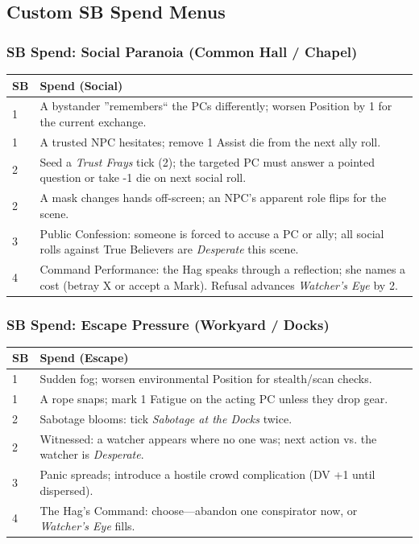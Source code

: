 \documentclass[11pt]{article}
\begin{document}
\subsection{Custom SB Spend Menus}
\subsubsection{SB Spend: Social Paranoia (Common Hall / Chapel)}
\begin{longtable}{@{}p{1.5cm}p{13.2cm}@{}}
\toprule
\textbf{SB} & \textbf{Spend (Social)} \\
\midrule
1 & A bystander ''remembers`` the PCs differently; worsen Position by 1 for the current exchange. \\
1 & A trusted NPC hesitates; remove 1 Assist die from the next ally roll. \\
2 & Seed a \emph{Trust Frays} tick (2); the targeted PC must answer a pointed question or take -1 die on next social roll. \\
2 & A mask changes hands off-screen; an NPC's apparent role flips for the scene. \\
3 & Public Confession: someone is forced to accuse a PC or ally; all social rolls against True Believers are \emph{Desperate} this scene. \\
4 & Command Performance: the Hag speaks through a reflection; she names a cost (betray X or accept a Mark). Refusal advances \emph{Watcher's Eye} by 2. \\
\bottomrule
\end{longtable}

\subsubsection{SB Spend: Escape Pressure (Workyard / Docks)}
\begin{longtable}{@{}p{1.5cm}p{13.2cm}@{}}
\toprule
\textbf{SB} & \textbf{Spend (Escape)} \\
\midrule
1 & Sudden fog; worsen environmental Position for stealth/scan checks. \\
1 & A rope snaps; mark 1 Fatigue on the acting PC unless they drop gear. \\
2 & Sabotage blooms: tick \emph{Sabotage at the Docks} twice. \\
2 & Witnessed: a watcher appears where no one was; next action vs. the watcher is \emph{Desperate}. \\
3 & Panic spreads; introduce a hostile crowd complication (DV +1 until dispersed). \\
4 & The Hag's Command: choose---abandon one conspirator now, or \emph{Watcher's Eye} fills. \\
\bottomrule
\end{longtable}
\end{document}
